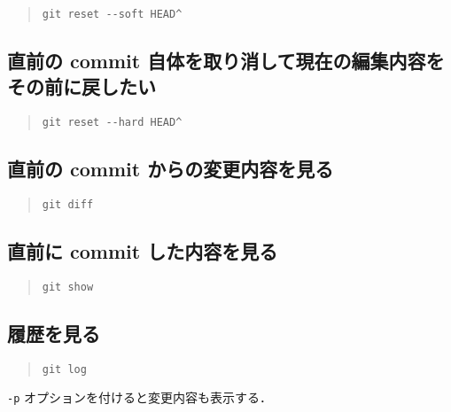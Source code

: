 \documentclass[a4j,10pt]{jarticle}
\begin{document}
\begin{quote}
\begin{verbatim}
git reset --soft HEAD^
\end{verbatim}
\end{quote}

\subsection{直前の commit 自体を取り消して現在の編集内容をその前に戻したい}

\begin{quote}
\begin{verbatim}
git reset --hard HEAD^
\end{verbatim}
\end{quote}

\subsection{直前の commit からの変更内容を見る}

\begin{quote}
\begin{verbatim}
git diff
\end{verbatim}
\end{quote}

\subsection{直前に commit した内容を見る}

\begin{quote}
\begin{verbatim}
git show
\end{verbatim}
\end{quote}

\subsection{履歴を見る}

\begin{quote}
\begin{verbatim}
git log
\end{verbatim}
\end{quote}

\verb|-p| オプションを付けると変更内容も表示する．
\end{document}

